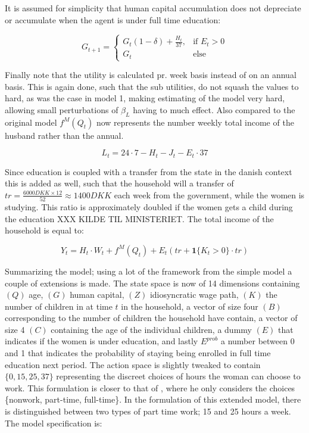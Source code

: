 It is assumed for simplicity that human capital accumulation does not depreciate or accumulate when the agent is under full time education:

\begin{equation}
    G_{t+1} = 
    \begin{cases}
        G_t(1 - \delta) + \frac{H_t}{37}, & \text{if } E_t > 0 \\
        G_t & \text{else}
    \end{cases}
\end{equation}


Finally note that the utility is calculated pr. week basis instead of on an annual basis. This is again done, such that the sub utilities, do not squash the values to hard, as was the case in model 1, making estimating of the model very hard, allowing small perturbations of $\beta_L$ having to much effect. Also compared to the original model $f^M(Q_t)$ now represents the number weekly total income of the husband rather than the annual.

\begin{equation}
    L_t = 24 \cdot 7 - H_t - J_t - E_t \cdot 37
\end{equation}

Since education is coupled with a transfer from the state in the danish context this is added as well, such that the household will a transfer of $tr = \frac{6000 DKK \times 12}{52} \approx 1400 DKK$ each week from the government, while the women is studying. This ratio is approximately doubled if the women gets a child during the education XXX KILDE TIL MINISTERIET. The total income of the household is equal to:

\begin{equation}
    Y_t = H_t \cdot W_t + f^M(Q_t) + E_t (tr + \mathbf{1} \{ K_t > 0 \} \cdot tr)  
\end{equation}


Summarizing the model; using a lot of the framework from the simple model a couple of extensions is made. The state space is now of 14 dimensions containing $(Q)$ age, $(G)$ human capital, $(Z)$ idiosyncratic wage path, $(K)$ the number of children in at time $t$ in the household, a vector of size four $(B)$ corresponding to the number of children the household have contain, a vector of size 4 $(C)$ containing the age of the individual children, a dummy $(E)$ that indicates if the women is under education, and lastly $E^{prob}$ a number between 0 and 1 that indicates the probability of staying being enrolled in full time education next period. The action space is slightly tweaked to contain $\{ 0, 15, 25, 37\}$ representing the discreet choices of hours the woman can choose to work. This formulation is closer to that of \textcite{francesconi_joint_2002}, where he only considers the choices \{nonwork, part-time, full-time\}. In the formulation of this extended model, there is distinguished between two types of part time work; 15 and 25 hours a week. The model specification is:

